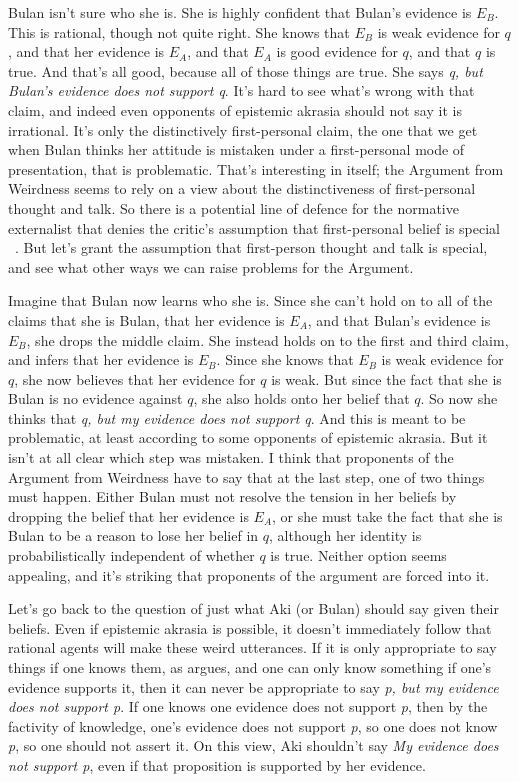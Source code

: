 \gls{Bulan} isn't sure who she is. She is highly confident that \gls{Bulan}'s evidence is $E_B$. This is rational, though not quite right. She knows that $E_B$ is weak evidence for $q$, and that her evidence is $E_A$, and that $E_A$ is good evidence for $q$, and that $q$ is true. And that's all good, because all of those things are true. She says \emph{q, but Bulan's evidence does not support q}. It's hard to see what's wrong with that claim, and indeed even opponents of epistemic akrasia should not say it is irrational. It's only the distinctively first-personal claim, the one that we get when \gls{Bulan} thinks her attitude is mistaken under a first-personal mode of presentation, that is problematic. That's interesting in itself; the Argument from Weirdness seems to rely on a view about the distinctiveness of first-personal thought and talk. So there is a potential line of defence for the normative externalist that denies the critic's assumption that first-personal belief is special ~\citep{CappelenDever2014}. But let's grant the assumption that first-person thought and talk is special, and see what other ways we can raise problems for the Argument.

Imagine that \gls{Bulan} now learns who she is. Since she can't hold on to all of the claims that she is \gls{Bulan}, that her evidence is $E_A$, and that \gls{Bulan}'s evidence is $E_B$, she drops the middle claim. She instead holds on to the first and third claim, and infers that her evidence is $E_B$. Since she knows that $E_B$ is weak evidence for $q$, she now believes that her evidence for $q$ is weak. But since the fact that she is \gls{Bulan} is no evidence against $q$, she also holds onto her belief that $q$. So now she thinks that \emph{q, but my evidence does not support q}. And this is meant to be problematic, at least according to some opponents of epistemic akrasia. But it isn't at all clear which step was mistaken. I think that proponents of the Argument from Weirdness have to say that at the last step, one of two things must happen. Either \gls{Bulan} must not resolve the tension in her beliefs by dropping the belief that her evidence is $E_A$, or she must take the fact that she is \gls{Bulan} to be a reason to lose her belief in $q$, although her identity is probabilistically independent of whether $q$ is true. Neither option seems appealing, and it's striking that proponents of the argument are forced into it.

Let's go back to the question of just what \gls{Aki} (or Bulan) should say given their beliefs. Even if epistemic akrasia is possible, it doesn't immediately follow that rational agents will make these weird utterances. If it is only appropriate to say things if one knows them, as \citet{Williamson2000} argues, and one can only know something if one's evidence supports it, then it can never be appropriate to say \emph{p, but my evidence does not support p}. If one knows one evidence does not support \emph{p}, then by the factivity of knowledge, one's evidence does not support \emph{p}, so one does not know \emph{p}, so one should not assert it. On this view, \gls{Aki} shouldn't say \emph{My evidence does not support p}, even if that proposition is supported by her evidence.

